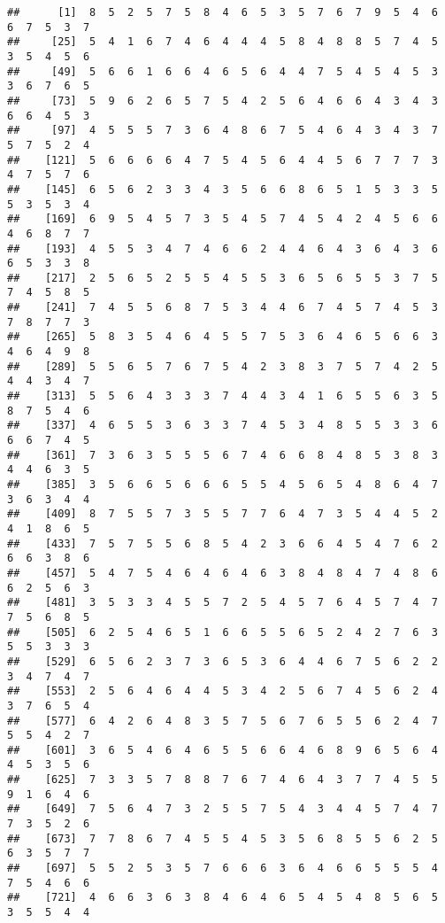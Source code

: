 \documentclass[
]{book}
\begin{document}
\begin{verbatim}
##      [1]  8  5  2  5  7  5  8  4  6  5  3  5  7  6  7  9  5  4  6  6  7  5  3  7
##     [25]  5  4  1  6  7  4  6  4  4  4  5  8  4  8  8  5  7  4  5  3  5  4  5  6
##     [49]  5  6  6  1  6  6  4  6  5  6  4  4  7  5  4  5  4  5  3  3  6  7  6  5
##     [73]  5  9  6  2  6  5  7  5  4  2  5  6  4  6  6  4  3  4  3  6  6  4  5  3
##     [97]  4  5  5  5  7  3  6  4  8  6  7  5  4  6  4  3  4  3  7  5  7  5  2  4
##    [121]  5  6  6  6  6  4  7  5  4  5  6  4  4  5  6  7  7  7  3  4  7  5  7  6
##    [145]  6  5  6  2  3  3  4  3  5  6  6  8  6  5  1  5  3  3  5  5  3  5  3  4
##    [169]  6  9  5  4  5  7  3  5  4  5  7  4  5  4  2  4  5  6  6  4  6  8  7  7
##    [193]  4  5  5  3  4  7  4  6  6  2  4  4  6  4  3  6  4  3  6  6  5  3  3  8
##    [217]  2  5  6  5  2  5  5  4  5  5  3  6  5  6  5  5  3  7  5  7  4  5  8  5
##    [241]  7  4  5  5  6  8  7  5  3  4  4  6  7  4  5  7  4  5  3  7  8  7  7  3
##    [265]  5  8  3  5  4  6  4  5  5  7  5  3  6  4  6  5  6  6  3  4  6  4  9  8
##    [289]  5  5  6  5  7  6  7  5  4  2  3  8  3  7  5  7  4  2  5  4  4  3  4  7
##    [313]  5  5  6  4  3  3  3  7  4  4  3  4  1  6  5  5  6  3  5  8  7  5  4  6
##    [337]  4  6  5  5  3  6  3  3  7  4  5  3  4  8  5  5  3  3  6  6  6  7  4  5
##    [361]  7  3  6  3  5  5  5  6  7  4  6  6  8  4  8  5  3  8  3  4  4  6  3  5
##    [385]  3  5  6  6  5  6  6  6  5  5  4  5  6  5  4  8  6  4  7  3  6  3  4  4
##    [409]  8  7  5  5  7  3  5  5  7  7  6  4  7  3  5  4  4  5  2  4  1  8  6  5
##    [433]  7  5  7  5  5  6  8  5  4  2  3  6  6  4  5  4  7  6  2  6  6  3  8  6
##    [457]  5  4  7  5  4  6  4  6  4  6  3  8  4  8  4  7  4  8  6  6  2  5  6  3
##    [481]  3  5  3  3  4  5  5  7  2  5  4  5  7  6  4  5  7  4  7  7  5  6  8  5
##    [505]  6  2  5  4  6  5  1  6  6  5  5  6  5  2  4  2  7  6  3  5  5  3  3  3
##    [529]  6  5  6  2  3  7  3  6  5  3  6  4  4  6  7  5  6  2  2  3  4  7  4  7
##    [553]  2  5  6  4  6  4  4  5  3  4  2  5  6  7  4  5  6  2  4  3  7  6  5  4
##    [577]  6  4  2  6  4  8  3  5  7  5  6  7  6  5  5  6  2  4  7  5  5  4  2  7
##    [601]  3  6  5  4  6  4  6  5  5  6  6  4  6  8  9  6  5  6  4  4  5  3  5  6
##    [625]  7  3  3  5  7  8  8  7  6  7  4  6  4  3  7  7  4  5  5  9  1  6  4  6
##    [649]  7  5  6  4  7  3  2  5  5  7  5  4  3  4  4  5  7  4  7  7  3  5  2  6
##    [673]  7  7  8  6  7  4  5  5  4  5  3  5  6  8  5  5  6  2  5  6  3  5  7  7
##    [697]  5  5  2  5  3  5  7  6  6  6  3  6  4  6  6  5  5  5  4  7  5  4  6  6
##    [721]  4  6  6  3  6  3  8  4  6  4  6  5  4  5  4  8  5  6  5  3  5  5  4  4

\end{verbatim}
\end{document}
